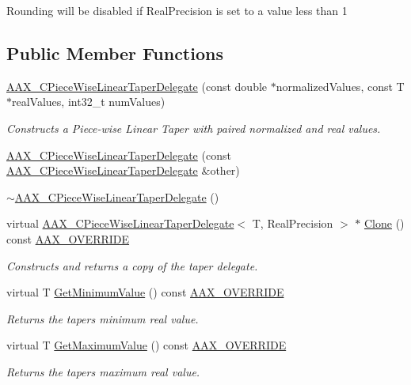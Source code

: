 Rounding will be disabled if Real\+Precision is set to a value less than 1 \subsection*{Public Member Functions}
\begin{DoxyCompactItemize}
\item 
\hyperlink{a00037_a265a1e6a8f81a1ad8e1aad7ebfceb480}{A\+A\+X\+\_\+\+C\+Piece\+Wise\+Linear\+Taper\+Delegate} (const double $\ast$normalized\+Values, const T $\ast$real\+Values, int32\+\_\+t num\+Values)
\begin{DoxyCompactList}\small\item\em Constructs a Piece-\/wise Linear Taper with paired normalized and real values. \end{DoxyCompactList}\item 
\hyperlink{a00037_a39168e515e1670b03bf463aae266ed15}{A\+A\+X\+\_\+\+C\+Piece\+Wise\+Linear\+Taper\+Delegate} (const \hyperlink{a00037}{A\+A\+X\+\_\+\+C\+Piece\+Wise\+Linear\+Taper\+Delegate} \&other)
\item 
\hyperlink{a00037_a509915ce4f38ad211185baac8f37e13b}{$\sim$\+A\+A\+X\+\_\+\+C\+Piece\+Wise\+Linear\+Taper\+Delegate} ()
\item 
virtual \hyperlink{a00037}{A\+A\+X\+\_\+\+C\+Piece\+Wise\+Linear\+Taper\+Delegate}$<$ T, Real\+Precision $>$ $\ast$ \hyperlink{a00037_ab8f9b4076d5d26f2fa8ce2ac34406241}{Clone} () const \hyperlink{a00149_ac2f24a5172689ae684344abdcce55463}{A\+A\+X\+\_\+\+O\+V\+E\+R\+R\+I\+D\+E}
\begin{DoxyCompactList}\small\item\em Constructs and returns a copy of the taper delegate. \end{DoxyCompactList}\item 
virtual T \hyperlink{a00037_a20eaec290a32fc0ae66de966981cea22}{Get\+Minimum\+Value} () const \hyperlink{a00149_ac2f24a5172689ae684344abdcce55463}{A\+A\+X\+\_\+\+O\+V\+E\+R\+R\+I\+D\+E}
\begin{DoxyCompactList}\small\item\em Returns the taper\textquotesingle{}s minimum real value. \end{DoxyCompactList}\item 
virtual T \hyperlink{a00037_ad6bef0be23e9b3b89c4aa6615c0c87da}{Get\+Maximum\+Value} () const \hyperlink{a00149_ac2f24a5172689ae684344abdcce55463}{A\+A\+X\+\_\+\+O\+V\+E\+R\+R\+I\+D\+E}
\begin{DoxyCompactList}\small\item\em Returns the taper\textquotesingle{}s maximum real value. \end{DoxyCompactList}\item 

\end{DoxyCompactItemize}
